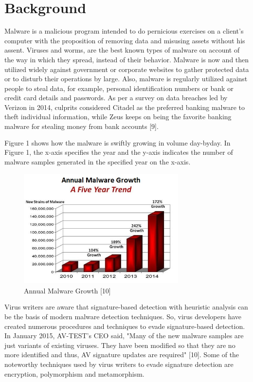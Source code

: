 \chapter{Background}

Malware is a malicious program intended to do pernicious exercises on a client's computer with the proposition of removing data and misusing assets without his assent. Viruses and worms, are the best known types of malware on account of the way in which they spread, instead of their behavior. Malware is now and then utilized widely against government or corporate websites to gather protected data or to disturb their operations by large. Also, malware is regularly utilized against people to steal data, for example, personal identification numbers or bank or credit card details and passwords. As per a survey on data breaches led by Verizon in 2014, culprits considered Citadel as the preferred banking malware to theft individual information, while Zeus keeps on being the favorite banking malware for stealing money from bank accounts [9].

Figure 1 shows how the malware is swiftly growing in volume day-byday. In Figure 1, the x-axis specifies the year and the y-axis indicates the number of malware samples generated in the specified year on the x-axis.

\begin{figure}
    \centering    
    \includegraphics[width=8.4cm, height=6cm]{malware-growth-chart.jpg}
    \caption[Annual Malware Growth]{Annual Malware Growth [10]}
\end{figure}
Virus writers are aware that signature-based detection with heuristic analysis can be the basis of modern malware detection techniques. So, virus developers have created numerous procedures and techniques to evade signature-based detection. In January 2015, AV-TEST's CEO said, "Many of the new malware samples are just variants of existing viruses. They have been modified so that they are no more identified and thus, AV signature updates are required" [10]. Some of the noteworthy techniques used by virus writers to evade signature detection are encryption, polymorphism and metamorphism.

